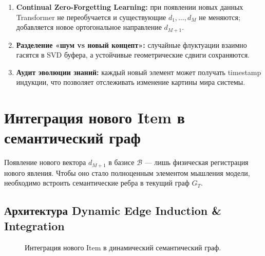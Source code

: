 \documentclass[11pt,a4paper]{article}
\begin{document}
\begin{enumerate}
    \item \textbf{Continual Zero-Forgetting Learning:} при появлении новых данных Transformer не переобучается и существующие $d_1,\dots,d_M$ не меняются; добавляется новое ортогональное направление $d_{M+1}$.
    \item \textbf{Разделение «шум vs новый концепт»:} случайные флуктуации взаимно гасятся в SVD буфера, а устойчивые геометрические сдвиги сохраняются.
    \item \textbf{Аудит эволюции знаний:} каждый новый элемент может получать timestamp индукции, что позволяет отслеживать изменение картины мира системы.
\end{enumerate}

\section{Интеграция нового Item в семантический граф}

Появление нового вектора $d_{M+1}$ в базисе $\mathcal{B}$ — лишь физическая регистрация нового явления. Чтобы оно стало полноценным элементом мышления модели, необходимо встроить семантические ребра в текущий граф $G_T$.

\subsection*{Архитектура Dynamic Edge Induction \& Integration}

\begin{figure}[h!]
\centering
{}
\caption{Интеграция нового Item в динамический семантический граф.}
\end{figure}
\end{document}
